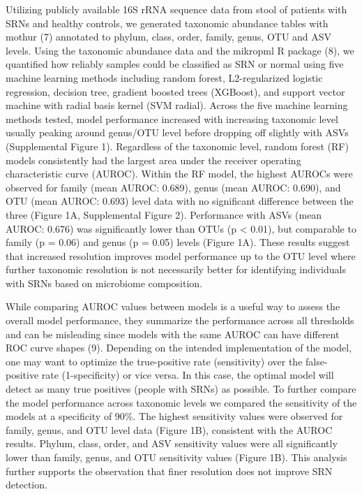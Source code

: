 \documentclass[]{article}
\begin{document}
Utilizing publicly available 16S rRNA sequence data from stool of
patients with SRNs and healthy controls, we generated taxonomic
abundance tables with mothur (7) annotated to phylum, class, order,
family, genus, OTU and ASV levels. Using the taxonomic abundance data
and the mikropml R package (8), we quantified how reliably samples could
be classified as SRN or normal using five machine learning methods
including random forest, L2-regularized logistic regression, decision
tree, gradient boosted trees (XGBoost), and support vector machine with
radial basis kernel (SVM radial). Across the five machine learning
methods tested, model performance increased with increasing taxonomic
level usually peaking around genus/OTU level before dropping off
slightly with ASVs (Supplemental Figure 1). Regardless of the taxonomic
level, random forest (RF) models consistently had the largest area under
the receiver operating characteristic curve (AUROC). Within the RF
model, the highest AUROCs were observed for family (mean AUROC: 0.689),
genus (mean AUROC: 0.690), and OTU (mean AUROC: 0.693) level data with
no significant difference between the three (Figure 1A, Supplemental
Figure 2). Performance with ASVs (mean AUROC: 0.676) was significantly
lower than OTUs (p \textless{} 0.01), but comparable to family (p =
0.06) and genus (p = 0.05) levels (Figure 1A). These results suggest
that increased resolution improves model performance up to the OTU level
where further taxonomic resolution is not necessarily better for
identifying individuals with SRNs based on microbiome composition.

While comparing AUROC values between models is a useful way to assess
the overall model performance, they summarize the performance across all
thresholds and can be misleading since models with the same AUROC can
have different ROC curve shapes (9). Depending on the intended
implementation of the model, one may want to optimize the true-positive
rate (sensitivity) over the false-positive rate (1-specificity) or vice
versa. In this case, the optimal model will detect as many true
positives (people with SRNs) as possible. To further compare the model
performance across taxonomic levels we compared the sensitivity of the
models at a specificity of 90\%. The highest sensitivity values were
observed for family, genus, and OTU level data (Figure 1B), consistent
with the AUROC results. Phylum, class, order, and ASV sensitivity values
were all significantly lower than family, genus, and OTU sensitivity
values (Figure 1B). This analysis further supports the observation that
finer resolution does not improve SRN detection.
\end{document}
